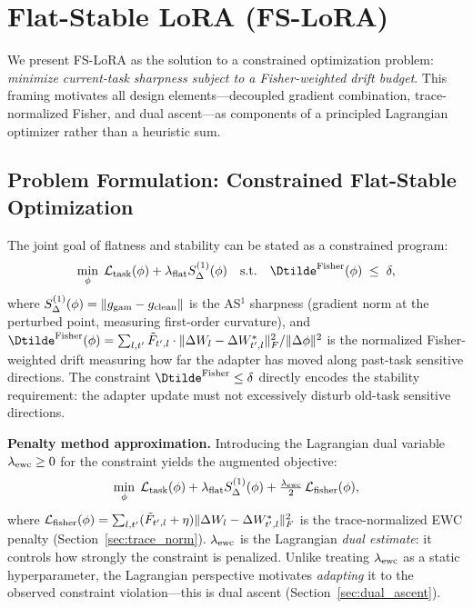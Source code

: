 \section{Flat-Stable LoRA (FS-LoRA)}
\label{sec:method}

We present FS-LoRA as the solution to a constrained optimization problem:
\emph{minimize current-task sharpness subject to a Fisher-weighted drift budget}.
This framing motivates all design elements---decoupled gradient combination,
trace-normalized Fisher, and dual ascent---as components of a principled Lagrangian
optimizer rather than a heuristic sum.

\subsection{Problem Formulation: Constrained Flat-Stable Optimization}
\label{sec:lagrangian}

The joint goal of flatness and stability can be stated as a constrained program:
\begin{equation}
  \min_\phi \;\Ltask(\phi) + \lambdaflat S^{(1)}_\Delta(\phi)
  \quad\text{s.t.}\quad
  \Dtilde^{\mathrm{Fisher}}(\phi) \;\leq\; \delta,
  \label{eq:constrained}
\end{equation}
where $S^{(1)}_\Delta(\phi) = \|g_{\mathrm{gam}} - g_{\mathrm{clean}}\|$ is the AS$^1$ sharpness
(gradient norm at the perturbed point, measuring first-order curvature),
and $\Dtilde^{\mathrm{Fisher}}(\phi) = \sum_{l,t'} \Ftilde_{t',l} \cdot \|\DeltaW_l - \DeltaW^*_{t',l}\|_F^2 / \|\Delta\phi\|^2$
is the normalized Fisher-weighted drift measuring how far the adapter has moved
along past-task sensitive directions.
The constraint $\Dtilde^{\mathrm{Fisher}} \leq \delta$ directly encodes the stability requirement:
the adapter update must not excessively disturb old-task sensitive directions.

\textbf{Penalty method approximation.}
Introducing the Lagrangian dual variable $\lambda_{\mathrm{ewc}} \geq 0$ for the constraint
yields the augmented objective:
\begin{equation}
  \min_\phi \;\mathcal{L}_{\mathrm{task}}(\phi) + \lambda_{\mathrm{flat}} S^{(1)}_\Delta(\phi)
  + \tfrac{\lambda_{\mathrm{ewc}}}{2}\,\mathcal{L}_{\mathrm{fisher}}(\phi),
  \label{eq:lagrangian}
\end{equation}
where $\mathcal{L}_{\mathrm{fisher}}(\phi) = \sum_{l,t'} (\tilde{F}_{t',l}+\eta)\|\Delta W_l-\Delta W^*_{t',l}\|_F^2$
is the trace-normalized EWC penalty (Section~\ref{sec:trace_norm}).
$\lambda_{\mathrm{ewc}}$ is the Lagrangian \emph{dual estimate}: it controls how strongly the constraint
is penalized.
Unlike treating $\lambda_{\mathrm{ewc}}$ as a static hyperparameter, the Lagrangian perspective
motivates \emph{adapting} it to the observed constraint violation---this is dual ascent
(Section~\ref{sec:dual_ascent}).

